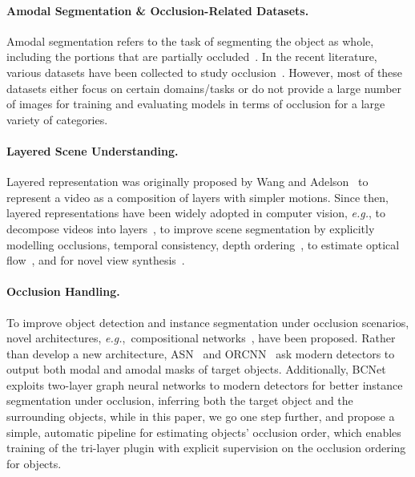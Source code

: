 \documentclass{bmvc2k}
\begin{document}
\paragraph{Amodal Segmentation \& Occlusion-Related Datasets.}
Amodal segmentation refers to the task of segmenting the object as whole, 
including the portions that are partially occluded~\cite{malik2016amodal, zhan2020self, sun2022amodal}. In the recent literature, 
various datasets have been collected to study occlusion~\cite{zhu2015cocoa, qi2019kins, chen2020transferable, cai2020messytable, wen2020ua}. However, most of these datasets  either focus on certain domains/tasks or do not provide a large number of images for 
training and evaluating models in terms of occlusion for a large variety of categories. 
\\[-0.9cm]

\paragraph{Layered Scene Understanding.}
Layered representation was originally proposed by Wang and Adelson~\cite{Wang94}
to represent a video as a composition of layers with simpler motions.
Since then, layered representations have been widely adopted in computer vision,
{\em e.g.}, to decompose videos into layers~\cite{brostow1999motion, Jojic01}, 
to improve scene segmentation by explicitly modelling occlusions, temporal consistency, depth ordering~\cite{winn2006layout, Kumar08,yang2010layered,yang2011layered},
to estimate optical flow~\cite{Sun12,Sun13,Wulff14,Wulff15}, and for novel view synthesis~\cite{zitnick2004high}. 
\\[-0.9cm]


\paragraph{Occlusion Handling.}
To improve object detection and instance segmentation under occlusion scenarios,
novel architectures, {\em e.g.},~compositional networks~\cite{wang2020robust, yuan2021robust}, 
have been proposed. Rather than develop a new architecture, ASN~\cite{qi2019kins} and ORCNN~\cite{follmann2019orcnn} ask modern detectors to output both modal and amodal masks of target objects. Additionally,
BCNet~\cite{ke2021bcnet} exploits two-layer graph neural networks 
to modern detectors for better instance segmentation under occlusion, inferring both the target object and the surrounding objects, 
while in this paper, we go one step further, and propose a simple, automatic pipeline for estimating objects' occlusion order, which enables training of the tri-layer plugin with explicit supervision on the occlusion ordering for objects. 
 \vspace{-0.2cm}
\end{document}
